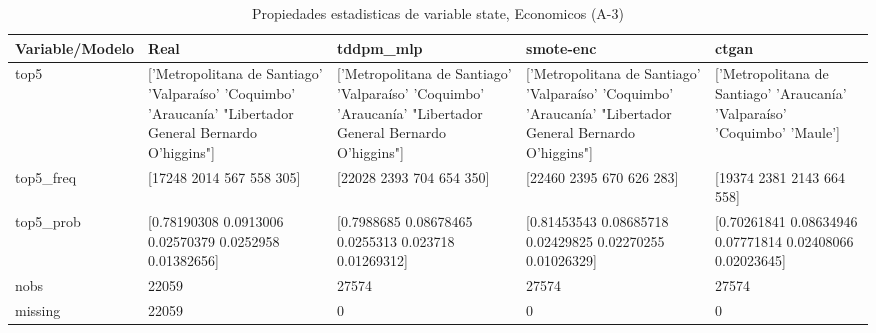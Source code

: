 \begin{table}[H]
\centering
\fontsize{8}{14}\selectfont
\caption{Propiedades  estadisticas de variable state, Economicos (A-3)}
\label{table-stats-economicos-a-3-state}
\begin{tabular}{|l|m{10em}|m{10em}|m{10em}|m{10em}|}
\hline
 \rowcolor[gray]{0.8}
Variable/Modelo & Real & tddpm\_mlp & smote-enc & ctgan \\
\hline top5 & ['Metropolitana de Santiago' 'Valparaíso' 'Coquimbo' 'Araucanía'
 "Libertador General Bernardo O'higgins"] & ['Metropolitana de Santiago' 'Valparaíso' 'Coquimbo' 'Araucanía'
 "Libertador General Bernardo O'higgins"] & ['Metropolitana de Santiago' 'Valparaíso' 'Coquimbo' 'Araucanía'
 "Libertador General Bernardo O'higgins"] & ['Metropolitana de Santiago' 'Araucanía' 'Valparaíso' 'Coquimbo' 'Maule'] \\
\hline top5\_freq & [17248  2014   567   558   305] & [22028  2393   704   654   350] & [22460  2395   670   626   283] & [19374  2381  2143   664   558] \\
\hline top5\_prob & [0.78190308 0.0913006  0.02570379 0.0252958  0.01382656] & [0.7988685  0.08678465 0.0255313  0.023718   0.01269312] & [0.81453543 0.08685718 0.02429825 0.02270255 0.01026329] & [0.70261841 0.08634946 0.07771814 0.02408066 0.02023645] \\
\hline nobs & 22059 & 27574 & 27574 & 27574 \\
\hline missing & 22059 & 0 & 0 & 0 \\
\hline
\end{tabular}
\end{table}

